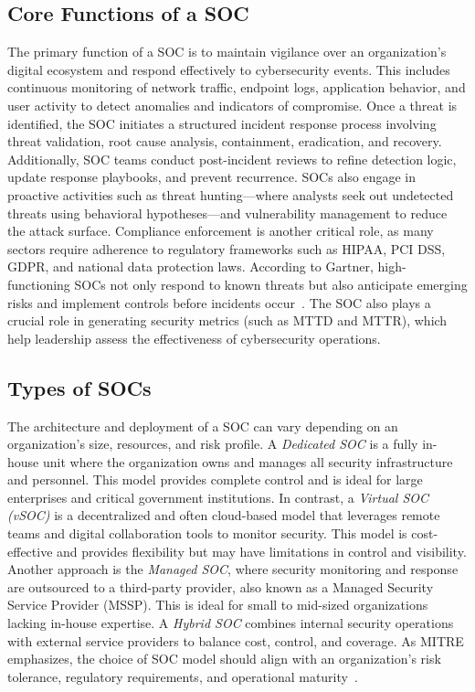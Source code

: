 \subsection{Core Functions of a SOC}\vspace{-0.5em}

The primary function of a SOC is to maintain vigilance over an organization’s digital ecosystem and respond effectively to cybersecurity events. This includes continuous monitoring of network traffic, endpoint logs, application behavior, and user activity to detect anomalies and indicators of compromise. Once a threat is identified, the SOC initiates a structured incident response process involving threat validation, root cause analysis, containment, eradication, and recovery. Additionally, SOC teams conduct post-incident reviews to refine detection logic, update response playbooks, and prevent recurrence. SOCs also engage in proactive activities such as threat hunting—where analysts seek out undetected threats using behavioral hypotheses—and vulnerability management to reduce the attack surface. Compliance enforcement is another critical role, as many sectors require adherence to regulatory frameworks such as HIPAA, PCI DSS, GDPR, and national data protection laws. According to Gartner, high-functioning SOCs not only respond to known threats but also anticipate emerging risks and implement controls before incidents occur~\cite{gartner}. The SOC also plays a crucial role in generating security metrics (such as MTTD and MTTR), which help leadership assess the effectiveness of cybersecurity operations.

\subsection{Types of SOCs}\vspace{-0.5em}

The architecture and deployment of a SOC can vary depending on an organization's size, resources, and risk profile. A \textit{Dedicated SOC} is a fully in-house unit where the organization owns and manages all security infrastructure and personnel. This model provides complete control and is ideal for large enterprises and critical government institutions. In contrast, a \textit{Virtual SOC (vSOC)} is a decentralized and often cloud-based model that leverages remote teams and digital collaboration tools to monitor security. This model is cost-effective and provides flexibility but may have limitations in control and visibility. Another approach is the \textit{Managed SOC}, where security monitoring and response are outsourced to a third-party provider, also known as a Managed Security Service Provider (MSSP). This is ideal for small to mid-sized organizations lacking in-house expertise. A \textit{Hybrid SOC} combines internal security operations with external service providers to balance cost, control, and coverage. As MITRE emphasizes, the choice of SOC model should align with an organization’s risk tolerance, regulatory requirements, and operational maturity~\cite{mitre_soc}.

